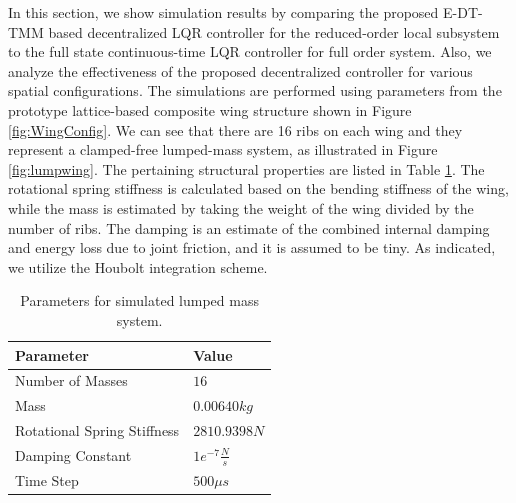 \documentclass[11pt]{ucthesis}
\begin{document}
In this section, we show simulation results by comparing the proposed E-DT-TMM based decentralized LQR controller for the reduced-order local subsystem to the full state continuous-time LQR controller for full order system. Also, we analyze the effectiveness of the proposed decentralized controller for various spatial configurations. The simulations are performed using parameters from the prototype lattice-based composite wing structure shown in Figure \ref{fig:WingConfig}. We can see that there are 16 ribs on each wing and they represent a clamped-free lumped-mass system, as illustrated in Figure \ref{fig:lumpwing}. The pertaining structural properties are listed in Table \ref{t:beam}. The rotational spring stiffness is calculated based on the bending stiffness of the wing, while the mass is estimated by taking the weight of the wing divided by the number of ribs. The damping is an estimate of the combined internal damping and energy loss due to joint friction, and it is assumed to be tiny. As indicated, we utilize the Houbolt integration scheme. 

\begin{table}
\begin{center}
\caption{Parameters for simulated lumped mass system.}
\label{t:beam}
\begin{tabular}{  p{5cm} p{1.9cm}}
Parameter&Value\\\hline
Number of Masses&$16$\\
Mass&$0.00640 kg$\\
Rotational Spring Stiffness&$2810.9398 N$\\
Damping Constant&$1e^{-7}\frac{N}{s}$\\
Time Step&$500 \mu s$\\
\end{tabular}
\end{center}
\end{table}
\end{document}
